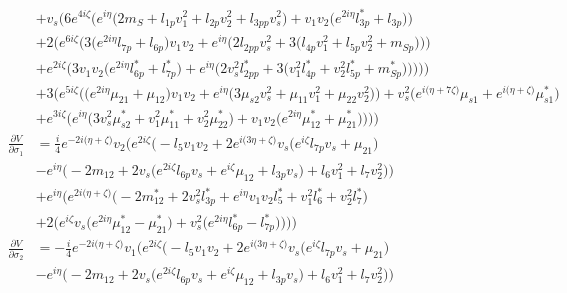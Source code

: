 \begin{align}
 &+v_s \Big(6 e^{4 i \zeta } \Big(e^{i \eta } \Big(2 m_{S}  + l_{1p} v_{1}^{2}  + l_{2p} v_{2}^{2}  + l_{3pp} v_{s}^{2} \Big) + v_1 v_2 \Big(e^{2 i \eta } l_{3p}^*  + l_{3p}\Big)\Big)\nonumber \\ 
 &+2 \Big(e^{6 i \zeta } \Big(3 \Big(e^{2 i \eta } l_{7p}  + l_{6p}\Big)v_1 v_2  + e^{i \eta } \Big(2 l_{2pp} v_{s}^{2}  + 3 \Big(l_{4p} v_{1}^{2}  + l_{5p} v_{2}^{2}  + m_{Sp}\Big)\Big)\Big)\nonumber \\ 
 &+e^{2 i \zeta } \Big(3 v_1 v_2 \Big(e^{2 i \eta } l_{6p}^*  + l_{7p}^*\Big) + e^{i \eta } \Big(2 v_{s}^{2} l_{2pp}^*  + 3 \Big(v_{1}^{2} l_{4p}^*  + v_{2}^{2} l_{5p}^*  + m_{Sp}^*\Big)\Big)\Big)\Big)\Big)\nonumber \\ 
 &+3 \Big(e^{5 i \zeta } \Big(\Big(e^{2 i \eta } \mu_{21}  + \mu_{12}\Big)v_1 v_2  + e^{i \eta } \Big(3 \mu_{s2} v_{s}^{2}  + \mu_{11} v_{1}^{2}  + \mu_{22} v_{2}^{2} \Big)\Big)+v_{s}^{2} \Big(e^{i \Big(\eta +7 \zeta \Big)} \mu_{s1}  + e^{i \Big(\eta +\zeta \Big)} \mu_{s1}^* \Big)\nonumber \\ 
 &+e^{3 i \zeta } \Big(e^{i \eta } \Big(3 v_{s}^{2} \mu_{s2}^*  + v_{1}^{2} \mu_{11}^*  + v_{2}^{2} \mu_{22}^* \Big) + v_1 v_2 \Big(e^{2 i \eta } \mu_{12}^*  + \mu_{21}^*\Big)\Big)\Big)\Big)\\ 
\frac{\partial V}{\partial \sigma_1} &= \frac{i}{4} e^{-2 i \Big(\eta +\zeta \Big)} v_2 \Big(e^{2 i \zeta } \Big(- l_5 v_1 v_2 +2 e^{i \Big(3 \eta +\zeta \Big)} v_s \Big(e^{i \zeta } l_{7p} v_s  + \mu_{21}\Big)\nonumber \\ 
 &- e^{i \eta } \Big(-2 m_{12}  + 2 v_s \Big(e^{2 i \zeta } l_{6p} v_s  + e^{i \zeta } \mu_{12}  + l_{3p} v_s \Big) + l_6 v_{1}^{2}  + l_7 v_{2}^{2} \Big)\Big)\nonumber \\ 
 &+e^{i \eta } \Big(e^{2 i \Big(\eta +\zeta \Big)} \Big(-2 m_{12}^*  + 2 v_{s}^{2} l_{3p}^*  + e^{i \eta } v_1 v_2 l_5^*  + v_{1}^{2} l_6^*  + v_{2}^{2} l_7^* \Big)\nonumber \\ 
 &+2 \Big(e^{i \zeta } v_s \Big(e^{2 i \eta } \mu_{12}^*  - \mu_{21}^* \Big) + v_{s}^{2} \Big(e^{2 i \eta } l_{6p}^*  - l_{7p}^* \Big)\Big)\Big)\Big)\\ 
\frac{\partial V}{\partial \sigma_2} &= -\frac{i}{4} e^{-2 i \Big(\eta +\zeta \Big)} v_1 \Big(e^{2 i \zeta } \Big(- l_5 v_1 v_2 +2 e^{i \Big(3 \eta +\zeta \Big)} v_s \Big(e^{i \zeta } l_{7p} v_s  + \mu_{21}\Big)\nonumber \\ 
 &- e^{i \eta } \Big(-2 m_{12}  + 2 v_s \Big(e^{2 i \zeta } l_{6p} v_s  + e^{i \zeta } \mu_{12}  + l_{3p} v_s \Big) + l_6 v_{1}^{2}  + l_7 v_{2}^{2} \Big)\Big)\nonumber \\ 

\end{align}
